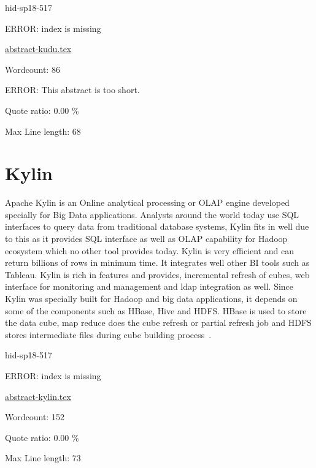 \begin{IU}

hid-sp18-517

ERROR: index is missing

\href{https://github.com/cloudmesh-community/hid-sp18-517/blob/master//technology/abstract-kudu.tex}{abstract-kudu.tex}

 

Wordcount: 86

ERROR: This abstract is too short.


Quote ratio: 0.00 \%
 
Max Line length: 68
\end{IU}

\section{Kylin}

Apache Kylin is an Online analytical processing or OLAP engine developed 
specially for Big Data applications. Analysts around the world today 
use SQL interfaces to query data from traditional database systems, 
Kylin fits in well due to this as it provides SQL interface as well 
as OLAP capability for Hadoop ecosystem which no other tool provides 
today. Kylin is very efficient and can return billions of rows in 
minimum time. It integrates well other BI tools such as Tableau. 
Kylin is rich in features and provides, incremental refresh of cubes, 
web interface for monitoring and management and ldap integration as 
well. Since Kylin was specially built for Hadoop and big data 
applications, it depends on some of the components such as HBase, 
Hive and HDFS. HBase is used to store the data cube, map reduce does 
the cube refresh or partial refresh job and HDFS stores intermediate 
files during cube building process~\cite{hid-sp18-517-ApacheKylin}.



\begin{IU}

hid-sp18-517

ERROR: index is missing

\href{https://github.com/cloudmesh-community/hid-sp18-517/blob/master//technology/abstract-kylin.tex}{abstract-kylin.tex}

 

Wordcount: 152


Quote ratio: 0.00 \%
 
Max Line length: 73
\end{IU}

